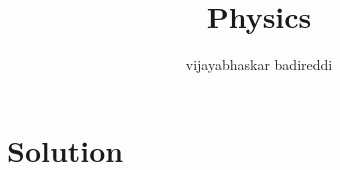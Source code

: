 \documentclass[12pt]{article}
\title{Physics}
\author{vijayabhaskar badireddi}
\date{}
\begin{document}

\section*{Solution}
\end{document}
